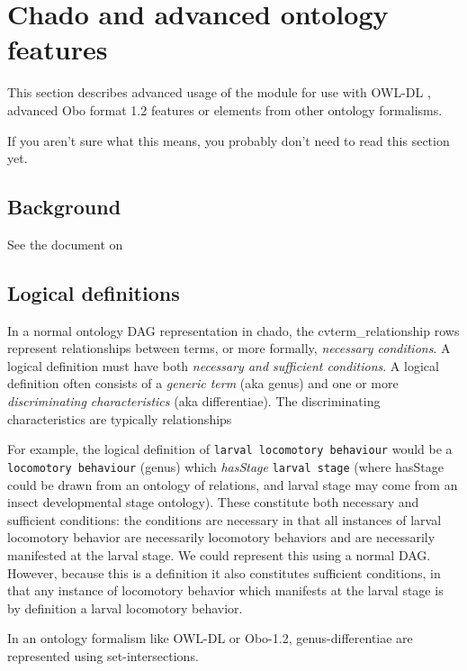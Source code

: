 \section{Chado and advanced ontology features}

This section describes advanced usage of the \cv module for use with
OWL-DL \cite{OWL}, advanced Obo format 1.2 \cite{OboFormat} features
or elements from other ontology formalisms.

If you aren't sure what this means, you probably don't need to read
this section yet.

\subsection{Background}

See the document on \cite{ConvertingOboToOWL}

\subsection{Logical definitions}

In a normal ontology DAG representation in chado, the
cvterm_relationship rows represent relationships between terms, or
more formally, {\em necessary conditions}. A logical definition must
have both {\em necessary and sufficient conditions}. A logical
definition often consists of a {\em generic term} (aka genus) and one
or more {\em discriminating characteristics} (aka differentiae). The
discriminating characteristics are typically relationships 

For example, the logical definition of {\tt larval locomotory
behaviour} would be a {\tt locomotory behaviour} (genus) which {\em
hasStage} {\tt larval stage} (where hasStage could be drawn from an
ontology of relations, and larval stage may come from an insect
developmental stage ontology). These constitute both necessary and
sufficient conditions: the conditions are necessary in that all
instances of larval locomotory behavior are necessarily locomotory
behaviors and are necessarily manifested at the larval stage. We could
represent this using a normal DAG. However, because this is a
definition it also constitutes sufficient conditions, in that any
instance of locomotory behavior which manifests at the larval stage is
by definition a larval locomotory behavior.

In an ontology formalism like OWL-DL or Obo-1.2, genus-differentiae
are represented using set-intersections.

